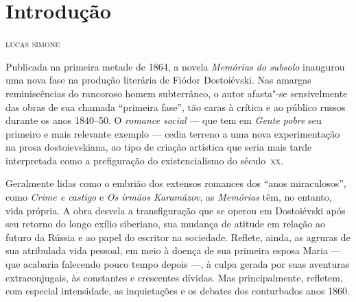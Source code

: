 \pagestyle{plain}

\chapter*{Introdução\smallskip{}}

\begin{flushright}
\textsc{lucas simone}
\end{flushright}

Publicada na primeira metade de 1864, a novela \textit{Memórias do subsolo}
inaugurou uma nova fase na produção literária de Fiódor Dostoiévski. Nas
amargas reminiscências do rancoroso homem subterrâneo, o autor afasta"-se
sensivelmente das obras de sua chamada ``primeira fase'', tão caras à crítica e
ao público russos durante os anos 1840--50. O \textit{romance social} --- que tem em
\textit{Gente pobre} seu primeiro e mais relevante exemplo --- cedia terreno a
uma nova experimentação na prosa dostoievskiana, ao tipo de criação artística
que seria mais tarde interpretada como a prefiguração do existencialismo do
século~\textsc{xx}.

Geralmente lidas como o embrião dos extensos romances dos ``anos miraculosos'',
como \textit{Crime e castigo} e \textit{Os irmãos Karamázov}, as
\textit{Memórias} têm, no entanto, vida própria. A obra desvela a
transfiguração que se operou em Dostoiévski após seu retorno do longo exílio
siberiano, sua mudança de atitude em relação ao futuro da Rússia e ao papel do
escritor na sociedade.  Reflete, ainda, as agruras de sua atribulada vida
pessoal, em meio à doença de sua primeira esposa Maria --- que acabaria falecendo
pouco tempo depois ---, à culpa gerada por suas aventuras extraconjugais, às
constantes e crescentes dívidas. Mas principalmente, refletem, com especial
intensidade, as inquietações e os debates dos conturbados anos 1860.

